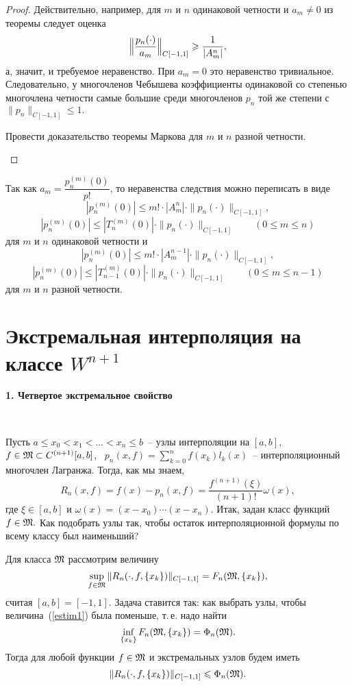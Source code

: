 \begin{proof} Действительно, например, для $m$ и $n$ {одинаковой}
{четности и $a_m\neq 0$} из теоремы следует {оценка}
\[
  \Bigl\| \frac{p_{n}(\cdot )}{a_m} \Bigr\|_{C[-1,1]}
  \ge \frac{1}{|A_m^{n}|},
\]
а, значит, и требуемое неравенство. {При $a_m=0$ это неравенство тривиальное.}
Следовательно, у многочленов Чебышева коэффициенты одинаковой
со степенью многочлена четности самые большие
{среди многочленов $p_n$ той же степени с $\|p_n\|_{C[-1,1]}\le 1.$}

\begin{ex}
Провести доказательство теоремы Маркова для $m$ и $n$
разной четности.
\end{ex}
\end{proof}

\begin{Remark} Так как $a_m={\dfrac{p_n^{(m)}(0)}{p!}}$,
то {неравенства следствия можно переписать} {в виде}
\[
  |p_n^{(m)}(0)| \le m!\cdot |A_m^n|\cdot  \|p_n(\cdot )\|_{C[-1,1]},
\]
\[
{|p_n^{(m)}(0)| \le |T_n^{(m)}(0)|\cdot \|p_n(\cdot )\|_{C[-1,1]}\qquad (0\le m\le n)}
\]
для $m$ и $n$ одинаковой четности и
\[
  |p_n^{(m)}(0)| \le m!\cdot |A_m^{n-1}|\cdot  \|p_n(\cdot )\|_{C[-1,1]},
\]
\[
{|p_n^{(m)}(0)| \le |T_{n-1}^{(m)}(0)|\cdot \|p_n(\cdot )\|_{C[-1,1]} \qquad (0\le m\le n-1)}
\]
для
$m$ и $n$ разной четности.
\end{Remark}

\section{Экстремальная интерполяция на классе $W^{n+1}$}

{\bf 1. Четвертое экстремальное свойство}

\ \

Пусть $a \le x_0<x_1<\dots <x_n\le b$~-- узлы интерполяции на
$[a,b],$ $f \in \G M \subset C^{(n+1)}[a,b]$,~ $p_n(x,f)=\sum\limits_{k=0}^n
f(x_k)l_k(x)$~-- интерполяционный многочлен Лагранжа. Тогда, как мы знаем,
\[
  R_n(x,f)=f(x)-p_n(x,f)=\frac{f^{(n+1)}(\xi)}{(n+1)!} \omega (x),
\]
где $\xi \in [a,b]$ и $\omega(x)=(x-x_0)\cdots (x-x_n).$
Итак, задан класс функций $f \in \G M.$
Как подобрать узлы так, чтобы остаток интерполяционной формулы по всему классу был
наименьший?


Для класса $\G M$
рассмотрим величину
\begin{equation}
\label{estim1}
  \sup_{f \in \G M}\| R_{n}(\cdot ,f,\{x_k\}) \|_{C[-1,1]}
                      =F_n(\G M,\{x_k\}),
\end{equation}
{считая $[a,b]=[-1,1]$.} Задача ставится так: как выбрать узлы,
чтобы величина~(\ref{estim1}) была поменьше, т.\,е. надо найти
\[
  \inf_{\{x_k\}}F_n(\G M,\{x_k\})=\Phi_n(\G M).
\]
{Тогда} для любой функции $f \in \G M $ {и экстремальных узлов будем иметь}
$$
{\| R_{n}(\cdot ,f,\{x_k\}) \|_{C[-1,1]} \le \Phi_n(\G M).}
$$

